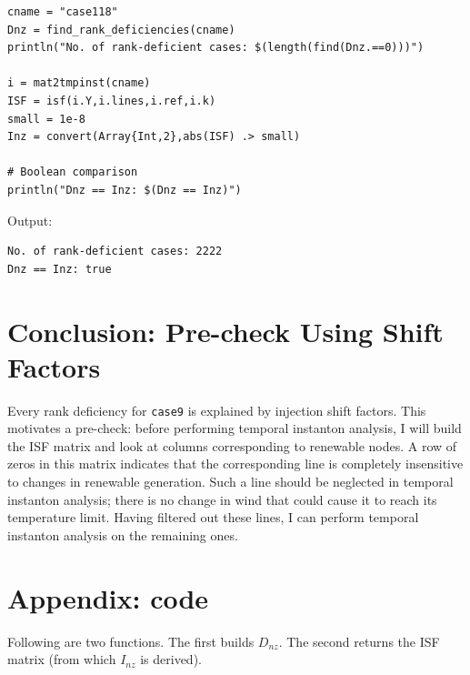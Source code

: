 \documentclass[10pt,letterpaper]{article}
\begin{document}
\begin{verbatim}
cname = "case118"
Dnz = find_rank_deficiencies(cname)
println("No. of rank-deficient cases: $(length(find(Dnz.==0)))")

i = mat2tmpinst(cname)
ISF = isf(i.Y,i.lines,i.ref,i.k)
small = 1e-8
Inz = convert(Array{Int,2},abs(ISF) .> small)

# Boolean comparison
println("Dnz == Inz: $(Dnz == Inz)")
\end{verbatim}
Output:
\begin{verbatim}
No. of rank-deficient cases: 2222
Dnz == Inz: true
\end{verbatim}

    \section*{Conclusion: Pre-check Using Shift Factors}\label{conclusion}

Every rank deficiency for \texttt{case9} is explained by injection shift
factors. This motivates a pre-check: before performing temporal
instanton analysis, I will build the ISF matrix and look at columns
corresponding to renewable nodes. A row of zeros in this matrix
indicates that the corresponding line is completely insensitive to
changes in renewable generation. Such a line should be neglected in
temporal instanton analysis; there is no change in wind that could cause
it to reach its temperature limit. Having filtered out these lines, I
can perform temporal instanton analysis on the remaining ones.

\clearpage
    \section*{Appendix: code}\label{appendix-code}

Following are two functions. The first builds \(D_{nz}\).
The second returns the ISF matrix (from which \(I_{nz}\) is derived).
\end{document}
